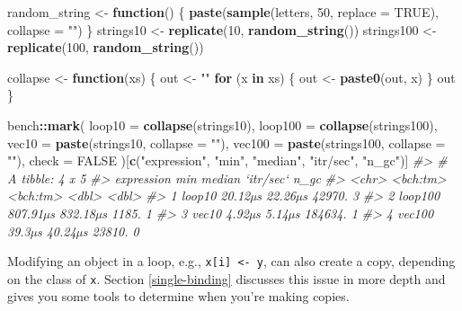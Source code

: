 \documentclass[]{book}
\newenvironment{Shaded}{\begin{snugshade}}{\end{snugshade}}
\newcommand{\CommentTok}[1]{\textcolor[rgb]{0.37,0.37,0.37}{\textit{#1}}}
\newcommand{\ControlFlowTok}[1]{\textcolor[rgb]{0.27,0.27,0.27}{\textbf{#1}}}
\newcommand{\DataTypeTok}[1]{\textcolor[rgb]{0.27,0.27,0.27}{#1}}
\newcommand{\DecValTok}[1]{\textcolor[rgb]{0.06,0.06,0.06}{#1}}
\newcommand{\KeywordTok}[1]{\textcolor[rgb]{0.27,0.27,0.27}{\textbf{#1}}}
\newcommand{\NormalTok}[1]{#1}
\newcommand{\OperatorTok}[1]{\textcolor[rgb]{0.43,0.43,0.43}{\textbf{#1}}}
\newcommand{\OtherTok}[1]{\textcolor[rgb]{0.37,0.37,0.37}{#1}}
\newcommand{\StringTok}[1]{\textcolor[rgb]{0.5,0.5,0.5}{#1}}
\begin{document}
\begin{Shaded}
\begin{Highlighting}[]
\NormalTok{random_string <-}\StringTok{ }\ControlFlowTok{function}\NormalTok{() \{}
  \KeywordTok{paste}\NormalTok{(}\KeywordTok{sample}\NormalTok{(letters, }\DecValTok{50}\NormalTok{, }\DataTypeTok{replace =} \OtherTok{TRUE}\NormalTok{), }\DataTypeTok{collapse =} \StringTok{""}\NormalTok{)}
\NormalTok{\}}
\NormalTok{strings10 <-}\StringTok{ }\KeywordTok{replicate}\NormalTok{(}\DecValTok{10}\NormalTok{, }\KeywordTok{random_string}\NormalTok{())}
\NormalTok{strings100 <-}\StringTok{ }\KeywordTok{replicate}\NormalTok{(}\DecValTok{100}\NormalTok{, }\KeywordTok{random_string}\NormalTok{())}

\NormalTok{collapse <-}\StringTok{ }\ControlFlowTok{function}\NormalTok{(xs) \{}
\NormalTok{  out <-}\StringTok{ ""}
  \ControlFlowTok{for}\NormalTok{ (x }\ControlFlowTok{in}\NormalTok{ xs) \{}
\NormalTok{    out <-}\StringTok{ }\KeywordTok{paste0}\NormalTok{(out, x)}
\NormalTok{  \}}
\NormalTok{  out}
\NormalTok{\}}

\NormalTok{bench}\OperatorTok{::}\KeywordTok{mark}\NormalTok{(}
  \DataTypeTok{loop10  =} \KeywordTok{collapse}\NormalTok{(strings10),}
  \DataTypeTok{loop100 =} \KeywordTok{collapse}\NormalTok{(strings100),}
  \DataTypeTok{vec10   =} \KeywordTok{paste}\NormalTok{(strings10, }\DataTypeTok{collapse =} \StringTok{""}\NormalTok{),}
  \DataTypeTok{vec100  =} \KeywordTok{paste}\NormalTok{(strings100, }\DataTypeTok{collapse =} \StringTok{""}\NormalTok{),}
  \DataTypeTok{check =} \OtherTok{FALSE}
\NormalTok{)[}\KeywordTok{c}\NormalTok{(}\StringTok{"expression"}\NormalTok{, }\StringTok{"min"}\NormalTok{, }\StringTok{"median"}\NormalTok{, }\StringTok{"itr/sec"}\NormalTok{, }\StringTok{"n_gc"}\NormalTok{)]}
\CommentTok{#> # A tibble: 4 x 5}
\CommentTok{#>   expression      min   median `itr/sec`  n_gc}
\CommentTok{#>   <chr>      <bch:tm> <bch:tm>     <dbl> <dbl>}
\CommentTok{#> 1 loop10      20.12µs  22.26µs    42970.     3}
\CommentTok{#> 2 loop100    807.91µs 832.18µs     1185.     1}
\CommentTok{#> 3 vec10        4.92µs   5.14µs   184634.     1}
\CommentTok{#> 4 vec100       39.3µs  40.24µs    23810.     0}
\end{Highlighting}
\end{Shaded}

Modifying an object in a loop, e.g., \texttt{x{[}i{]}\ \textless{}-\ y}, can also create a copy, depending on the class of \texttt{x}. Section \ref{single-binding} discusses this issue in more depth and gives you some tools to determine when you're making copies.
\end{document}
